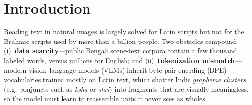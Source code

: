 \documentclass[iicol,pdflatex,sn-mathphys-num]{sn-jnl}
\begin{document}
\maketitle

\section{Introduction}\label{sec:intro}
Reading text in natural images is largely solved for Latin scripts but not
for the Brahmic scripts used by more than a billion people. Two obstacles
compound: (i)~\textbf{data scarcity}---public Bengali scene-text corpora
contain a few thousand labeled words, versus millions for English; and
(ii)~\textbf{tokenization mismatch}---modern vision--language models (VLMs)
inherit byte-pair-encoding (BPE) vocabularies trained mostly on Latin text,
which shatter Indic \emph{grapheme clusters} (e.g.\ conjuncts such as
\textit{ksha} or \textit{shri}) into fragments that are visually
meaningless, so the model must learn to reassemble units it never sees as
wholes.
\end{document}

